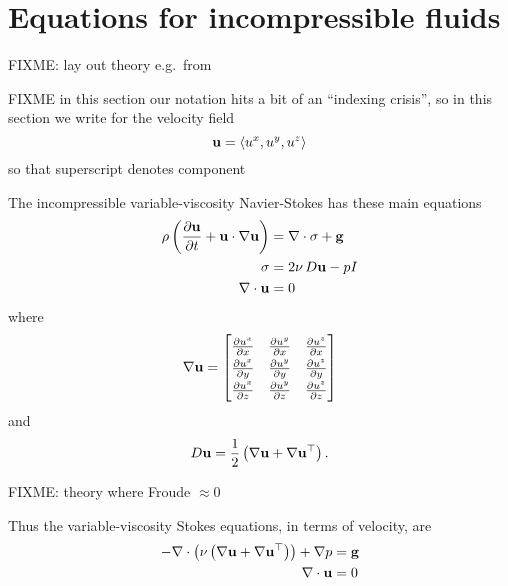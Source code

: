 
\section{Equations for incompressible fluids}

FIXME: lay out theory e.g.~from \citep{Acheson1990,Ockendonetal2003}

FIXME in this section our notation hits a bit of an ``indexing crisis'', so in this section we write for the velocity field
    $$\mathbf{u} = \left<u^x,u^y,u^z\right>$$
so that superscript denotes component

The incompressible variable-viscosity Navier-Stokes has these main equations
\begin{align}
\rho \left(\frac{\partial \mathbf{u}}{\partial t} + \mathbf{u} \cdot \nabla \mathbf{u}\right) &= \nabla\cdot \sigma + \mathbf{g} \label{eq:ok:stokesgeneralconserve} \\
\sigma &= 2 \nu\, D \mathbf{u} - p I \label{eq:ok:stokesgenerallaw} \\
\nabla\cdot \mathbf{u} &= 0 \label{eq:ok:stokesgeneralincomp}
\end{align}
where
  $$\grad \bu = \renewcommand{\arraystretch}{1.3}\begin{bmatrix}
    \frac{\partial u^x}{\partial x} & \frac{\partial u^y}{\partial x} & \frac{\partial u^z}{\partial x} \\
    \frac{\partial u^x}{\partial y} & \frac{\partial u^y}{\partial y} & \frac{\partial u^z}{\partial y} \\
    \frac{\partial u^x}{\partial z} & \frac{\partial u^y}{\partial z} & \frac{\partial u^z}{\partial z}
    \end{bmatrix}$$
and
    $$D \mathbf{u} = \frac{1}{2} \left(\nabla \mathbf{u} + \nabla \mathbf{u}^{\top}\right).$$

FIXME: theory where Froude $\approx 0$

Thus the variable-viscosity Stokes equations, in terms of velocity, are
\begin{align*}
- \nabla\cdot \left(\nu \left(\nabla \mathbf{u} + \nabla \mathbf{u}^{\top}\right)\right) + \nabla p &= \mathbf{g} \\
\nabla\cdot \mathbf{u} &= 0
\end{align*}

